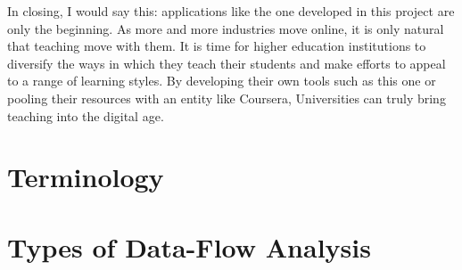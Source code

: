 \documentclass[bsc,twoside,singlespacing,parskip,logo,notimes,normalheadings]{infthesis}
\begin{document}
    In closing, I would say this: applications like the one developed
    in this project are only the beginning. As more and more
    industries move online, it is only natural that teaching move with
    them. It is time for higher education institutions to diversify
    the ways in which they teach their students and make efforts to
    appeal to a range of learning styles. By developing their own
    tools such as this one or pooling their resources with an entity
    like Coursera, Universities can truly bring teaching into the
    digital age.
    
    




\begin{appendices}

\chapter{Terminology}\label{appx:glossary}

\printglossaries

\chapter{Types of Data-Flow Analysis}\label{appx:analysistypes}


\end{appendices}
\end{document}

